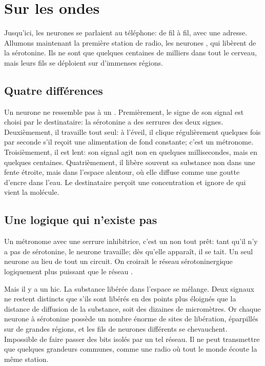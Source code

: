 \chapter{Sur les ondes}


Jusqu'ici, les neurones se parlaient au téléphone: de fil à fil, avec une adresse. Allumons maintenant la première station de radio, les neurones , qui libèrent de la sérotonine. Ils ne sont que quelques centaines de milliers dans tout le cerveau, mais leurs fils se déploient sur d'immenses régions.

\section*{Quatre différences}

Un neurone  ne ressemble pas à un . Premièrement, le signe de son signal est choisi par le destinataire: la sérotonine a des \og serrures\fg{} des deux signes. Deuxièmement, il travaille tout seul: à l'éveil, il clique régulièrement quelques fois par seconde s'il reçoit une alimentation de fond constante; c'est un métronome. Troisièmement, il est lent: son signal agit non en quelques millisecondes, mais en quelques centaines. Quatrièmement, il libère souvent sa substance non dans une fente étroite, mais dans l'espace alentour, où elle diffuse comme une goutte d'encre dans l'eau. Le destinataire perçoit une concentration et ignore de qui vient la molécule.

\section*{Une logique qui n'existe pas}

Un métronome avec une \og serrure\fg{} inhibitrice, c'est un \og non\fg{} tout prêt: tant qu'il n'y a pas de sérotonine, le neurone travaille; dès qu'elle apparaît, il se tait. Un seul neurone au lieu de tout un circuit. On croirait le réseau sérotoninergique logiquement plus puissant que le réseau .

Mais il y a un hic. La substance libérée dans l'espace se mélange. Deux signaux ne restent distincts que s'ils sont libérés en des points plus éloignés que la distance de diffusion de la substance, soit des dizaines de micromètres. Or chaque neurone à sérotonine possède un nombre énorme de sites de libération, éparpillés sur de grandes régions, et les \og fils\fg{} de neurones différents se chevauchent. Impossible de faire passer des bits isolés par un tel réseau. Il ne peut transmettre que quelques grandeurs communes, comme une radio où tout le monde écoute la même station.

